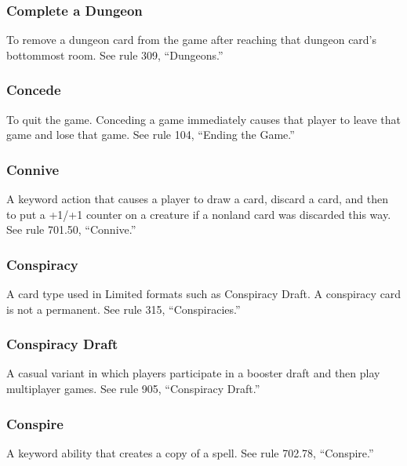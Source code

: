 {{{{{{\subsubsection*{Complete a Dungeon}

To remove a dungeon card from the game after reaching that dungeon card’s bottommost room. See rule 309, “Dungeons.”

\subsubsection*{Concede}

To quit the game. Conceding a game immediately causes that player to leave that game and lose that game. See rule 104, “Ending the Game.”

\subsubsection*{Connive}

A keyword action that causes a player to draw a card, discard a card, and then to put a +1/+1 counter on a creature if a nonland card was discarded this way. See rule 701.50, “Connive.”

\subsubsection*{Conspiracy}

A card type used in Limited formats such as Conspiracy Draft. A conspiracy card is not a permanent. See rule 315, “Conspiracies.”

\subsubsection*{Conspiracy Draft}

A casual variant in which players participate in a booster draft and then play multiplayer games. See rule 905, “Conspiracy Draft.”

\subsubsection*{Conspire}

A keyword ability that creates a copy of a spell. See rule 702.78, “Conspire.”

}}}}}}
